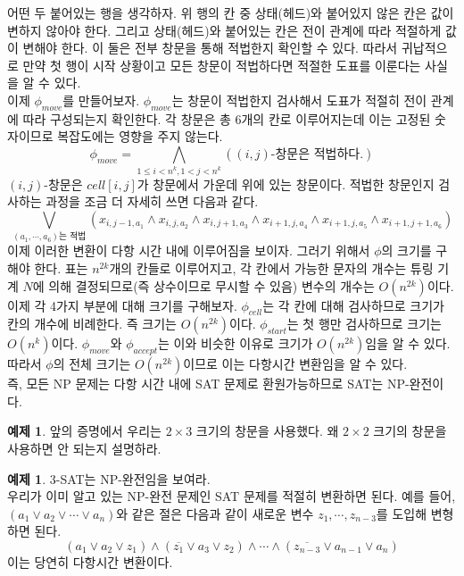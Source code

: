 \documentclass[b5paper, 10pt]{book}
\theoremstyle{definition}
\newtheorem{ex}[defn]{예제}
\newenvironment{pf*}{\pushQED{\qed}\pf}{\popQED\endpf}
\begin{document}
\begin{pf*}
\begin{table}[!ht]
         \caption{}
         \label{illegal_window}
    \end{table}
    어떤 두 붙어있는 행을 생각하자. 위 행의 칸 중 상태(헤드)와 붙어있지 않은 칸은 값이 변하지 않아야 한다.
    그리고 상태(헤드)와 붙어있는 칸은 전이 관계에 따라 적절하게 값이 변해야 한다.
    이 둘은 전부 창문을 통해 적법한지 확인할 수 있다.
    따라서 귀납적으로 만약 첫 행이 시작 상황이고 모든 창문이 적법하다면 
    적절한 도표를 이룬다는 사실을 알 수 있다.\\
    이제 $\phi_{move}$를 만들어보자. $\phi_{move}$는 창문이 적법한지 검사해서 
    도표가 적절히 전이 관계에 따라 구성되는지 확인한다. 
    각 창문은 총 6개의 칸로 이루어지는데 이는 고정된 숫자이므로 복잡도에는 영향을 주지 않는다. 
    $$\phi_{move} = \bigwedge_{1 \le i < n^k, 1<j<n^k} ((i,j)\text{-창문은 적법하다.})$$
    $(i,j)$-창문은 $cell[i,j]$가 창문에서 가운데 위에 있는 창문이다. 적법한 창문인지 검사하는 과정을
    조금 더 자세히 쓰면 다음과 같다.
    $$\bigvee_{(a_1, \cdots, a_6)\text{는 적법}} \left(
        x_{i,j-1,a_1} \wedge x_{i,j,a_2} \wedge x_{i, j+1, a_3} \wedge
        x_{i+1, j, a_4} \wedge x_{i+1, j, a_5} \wedge x_{i+1, j+1, a_6}
    \right)$$
    이제 이러한 변환이 다항 시간 내에 이루어짐을 보이자. 그러기 위해서 $\phi$의 크기를 구해야 한다. 
    표는 $n^{2k}$개의 칸들로 이루어지고, 각 칸에서 가능한 문자의 개수는 
    튜링 기계 $N$에 의해 결정되므로(즉 상수이므로 무시할 수 있음) 변수의 개수는 $O(n^{2k})$이다. \\ 
    이제 각 4가지 부분에 대해 크기를 구해보자. $\phi_{cell}$는 각 칸에 대해 검사하므로 크기가 칸의 개수에
    비례한다. 즉 크기는 $O(n^{2k})$이다. $\phi_{start}$는 첫 행만 검사하므로 크기는 $O(n^k)$이다.
    $\phi_{move}$와 $\phi_{accept}$는 이와 비슷한 이유로 크기가 $O(n^{2k})$임을 알 수 있다.
    따라서 $\phi$의 전체 크기는 $O(n^{2k})$이므로 이는 다항시간 변환임을 알 수 있다.\\
    즉, 모든 NP 문제는 다항 시간 내에 SAT 문제로 환원가능하므로 SAT는 NP-완전이다.
\end{pf*}
\begin{ex}
    앞의 증명에서 우리는 $2 \times 3$ 크기의 창문을 사용했다. 왜 $2 \times 2$ 크기의 창문을 사용하면 안 되는지 설명하라. 
\end{ex}
\begin{ex}
    3-SAT는 NP-완전임을 보여라. \\ 
    우리가 이미 알고 있는 NP-완전 문제인 SAT 문제를 적절히 변환하면 된다. 예를 들어, $(a_1 \vee a_2 \vee \cdots \vee a_n)$와
    같은 절은 다음과 같이 새로운 변수 $z_1, \cdots, z_{n-3}$를 도입해 변형하면 된다.
    $$(a_1 \vee a_2 \vee z_1) \wedge (\overline{z_1} \vee a_3 \vee z_2) \wedge \cdots \wedge 
    (\overline{z_{n-3}} \vee a_{n-1} \vee a_{n})$$
    이는 당연히 다항시간 변환이다.
\end{ex}
\end{document}
